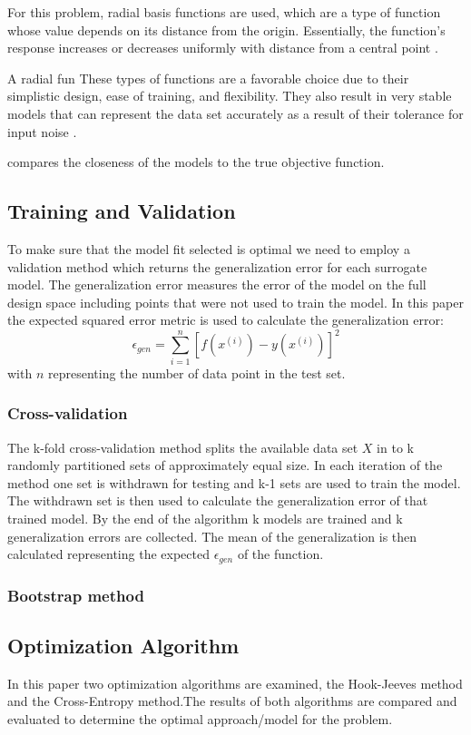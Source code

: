 \documentclass[conf]{new-aiaa}
\begin{document}
For this problem, radial basis functions are used, which are a type of function whose value depends on its distance from the origin. Essentially, the function's response increases or decreases uniformly with distance from a central point \cite{orr1996introduction}. 

A radial fun
These types of functions are a favorable choice due to their simplistic design, ease of training, and flexibility.  They also result in very stable models that can represent the data set accurately as a result of their tolerance for input noise \cite{yu2011advantages}.

compares the closeness of the models to the true objective function.  

\subsection{Training and Validation} %
To make sure that the model fit selected is optimal we need to employ a validation method which returns the generalization error for each surrogate model. The generalization error measures the error of the model on the full design space including points that were not used to train the model. In this paper the expected squared error metric is used to calculate the generalization error:
\[\epsilon_{gen} = \sum_{i=1}^{n} [f(x^{(i)})-y(x^{(i)})]^2\]
with $n$ representing the number of data point in the test set.

\subsubsection{Cross-validation}
The k-fold cross-validation method splits the available data set $X$ in to k randomly partitioned sets of approximately equal size. In each iteration of the method one set is withdrawn for testing and k-1 sets are used to train the model. The withdrawn set is then used to calculate the generalization error of that trained model. By the end of the algorithm k models are trained and k generalization errors are collected. The mean of the generalization is then calculated representing the expected $\epsilon_{gen}$ of the function.

\subsubsection{Bootstrap method}


\subsection{Optimization Algorithm} %
In this paper two optimization algorithms are examined, the Hook-Jeeves method and the Cross-Entropy method.The results of both algorithms are compared and evaluated to determine the optimal approach/model for the problem.
\end{document}
